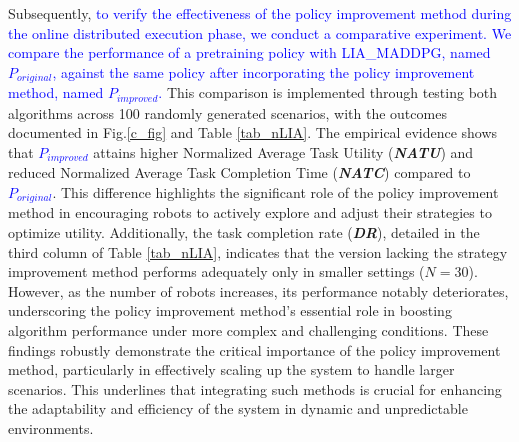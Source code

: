 \documentclass[lettersize,journal]{IEEEtran}
\newcommand{\blue}[1]{\textcolor{blue}{#1}}
\begin{document}
Subsequently, \blue{to verify the effectiveness of the policy improvement method during the online distributed execution phase, we conduct a comparative experiment. We compare the performance of a pretraining policy with LIA\_MADDPG, named $P_{original}$, against the same policy after incorporating the policy improvement method, named $P_{improved}$.} This comparison is implemented through testing both algorithms across 100 randomly generated scenarios, with the outcomes documented in Fig.\ref{c_fig} and Table \ref{tab_nLIA}. The empirical evidence shows that \blue{$P_{improved}$} attains higher Normalized Average Task Utility (\textit{\textbf{NATU}}) and reduced Normalized Average Task Completion Time (\textit{\textbf{NATC}}) compared to \blue{$P_{original}$}. This difference highlights the significant role of the policy improvement method in encouraging robots to actively explore and adjust their strategies to optimize utility. Additionally, the task completion rate (\textit{\textbf{DR}}), detailed in the third column of Table \ref{tab_nLIA}, indicates that the version lacking the strategy improvement method performs adequately only in smaller settings ($N=30$). However, as the number of robots increases, its performance notably deteriorates, underscoring the policy improvement method's essential role in boosting algorithm performance under more complex and challenging conditions. These findings robustly demonstrate the critical importance of the policy improvement method, particularly in effectively scaling up the system to handle larger scenarios. This underlines that integrating such methods is crucial for enhancing the adaptability and efficiency of the system in dynamic and unpredictable environments.
\end{document}
